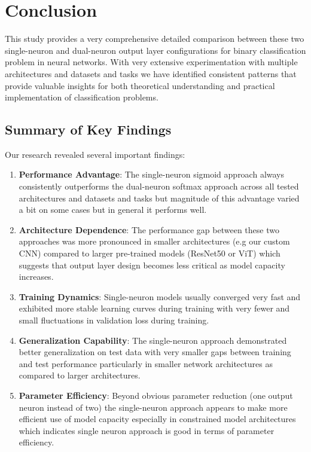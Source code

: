 \section{Conclusion}

This study provides a very comprehensive detailed comparison between these two single-neuron and dual-neuron output layer configurations for binary classification problem in neural networks. With very extensive experimentation with multiple architectures and datasets and tasks we have identified consistent patterns that provide valuable insights for both theoretical understanding and practical implementation of classification problems.

\subsection{Summary of Key Findings}

Our research revealed several important findings:

\begin{enumerate}
\item \textbf{Performance Advantage}: The single-neuron sigmoid approach always consistently outperforms the dual-neuron softmax approach across all tested architectures and datasets and tasks but magnitude of this advantage varied a bit on some cases but in general it performs well.

\item \textbf{Architecture Dependence}: The performance gap between these two approaches was more pronounced in smaller architectures (e.g our custom CNN) compared to larger pre-trained models (ResNet50 or ViT) which suggests that output layer design becomes less critical as model capacity increases.

\item \textbf{Training Dynamics}: Single-neuron models usually converged very fast and exhibited more stable learning curves during training with very fewer and small fluctuations in validation loss during training.

\item \textbf{Generalization Capability}: The single-neuron approach demonstrated better generalization on test data with very smaller gaps between training and test performance particularly in smaller network architectures as compared to larger architectures.

\item \textbf{Parameter Efficiency}: Beyond obvious parameter reduction (one output neuron instead of two) the single-neuron approach appears to make more efficient use of model capacity especially in constrained model architectures which indicates single neuron approach is good in terms of parameter efficiency.
\end{enumerate}

